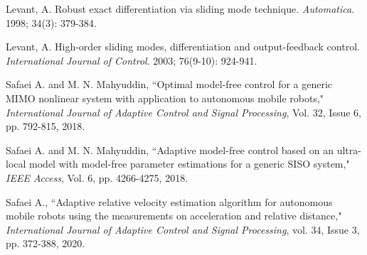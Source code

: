 \documentclass{article}
\begin{document}
\newpage
\begin{thebibliography}{99}

Levant, A. Robust exact differentiation via sliding mode technique. \textit{Automatica}. 1998; 34(3): 379-384.

Levant, A. High-order sliding modes, differentiation and output-feedback control. \textit{International Journal of Control}. 2003; 76(9-10): 924-941.

Safaei A. and M. N. Mahyuddin, ``Optimal model-free control for a generic MIMO nonlinear system with application to autonomous mobile robots," \textit{International Journal of Adaptive Control and Signal Processing}, Vol. 32, Issue 6, pp. 792-815, 2018.

Safaei A. and M. N. Mahyuddin, ``Adaptive model-free control based on an ultra-local model with model-free parameter estimations for a generic SISO system," \textit{IEEE Access}, Vol. 6, pp. 4266-4275, 2018.

Safaei A., ``Adaptive relative velocity estimation algorithm for autonomous mobile robots using the measurements on acceleration and relative distance," \textit{International Journal of Adaptive Control and Signal Processing}, vol. 34, Issue 3, pp. 372-388, 2020.

\end{thebibliography}
\end{document}
